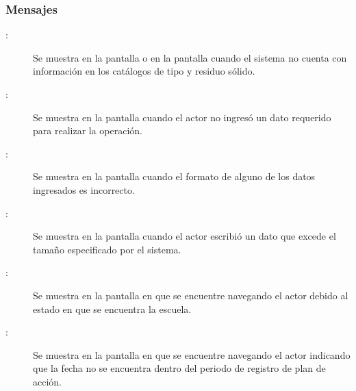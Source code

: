 \subsubsection{Mensajes}

    \begin{description}
      	    
	\item [:] Se muestra en la pantalla  o en la pantalla  cuando el sistema no cuenta con información en los catálogos de tipo y residuo sólido.
	\item[:] Se muestra en la pantalla  cuando el actor no ingresó un dato requerido para realizar la operación.
	\item[:] Se muestra en la pantalla  cuando el formato de alguno de los datos ingresados es incorrecto.
	\item[:] Se muestra en la pantalla  cuando el actor escribió un dato que excede el tamaño especificado por el sistema.
		\item[:] Se muestra en la pantalla en que se encuentre navegando el actor debido al estado en que se encuentra la escuela.	
	\item[\UCli {}:] Se muestra en la pantalla en que se encuentre navegando el actor indicando que la fecha no se encuentra dentro del periodo de registro de plan de acción.
	
    \end{description}
